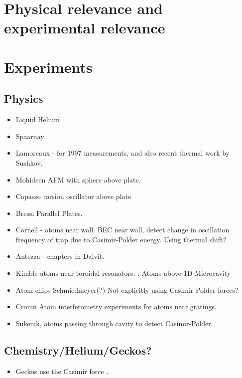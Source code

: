 \section{Physical relevance and experimental relevance}

\section{Experiments}
\subsection{Physics}
\begin{itemize}
\item Liquid Helium
\item Spaarnay
\item Lamoreaux - for 1997 measurements\cite{Lamoreaux1997}, and also recent thermal work by Sushkov\cite{Sushkov2011}.
\item Mohideen \cite{Mohideen1998} AFM with sphere above plate.
\item Capasso \cite{Chan2001}  torsion oscillator above plate
\item Bressi \cite{Bressi2002} Parallel Plates.
\item Cornell - atoms near wall\cite{Harber2005, Obrecht2007}.  BEC near wall, detect change in oscillation frequency of trap due to Casimir-Polder energy.  Using thermal shift?
\item Antezza - chapters in Dalvit.  
\item Kimble atoms near toroidal resonators.  \cite{Alton2011}.  Atoms above 1D Microcavity \cite{Hung2013}
\item Atom-chips  Schmiedmeyer\cite{Folman2000,Schneider2003}(?)  Not explicitly using Casimir-Polder forces?  
\item Cronin \cite{Perreault2005,Lonij2009}  Atom interferometry experiments for atoms near gratings.
\item Sukenik\cite{Sukenik1993}, atoms passing through cavity to detect Casimir-Polder.  
\end{itemize}

\subsection{Chemistry/Helium/Geckos?}

\begin{itemize}
\item Geckos use the Casimir force \cite{Autumn2002}.
\end{itemize}

